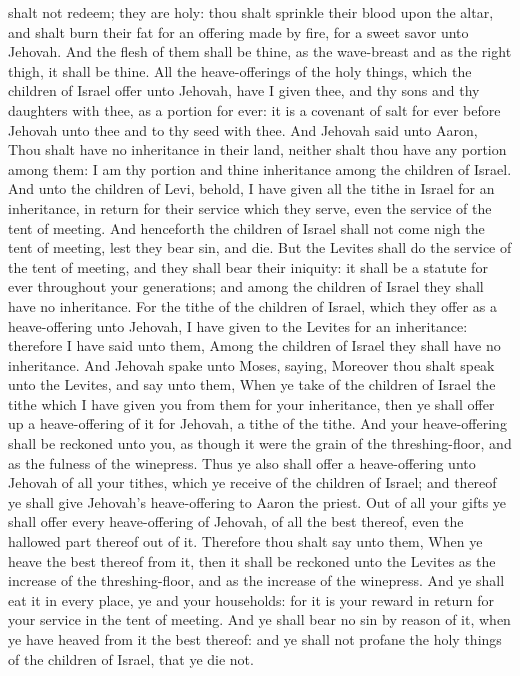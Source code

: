 shalt not redeem; they are holy: thou shalt sprinkle their blood upon the altar, and shalt burn their fat for an offering made by fire, for a sweet savor unto Jehovah. And the flesh of them shall be thine, as the wave-breast and as the right thigh, it shall be thine. All the heave-offerings of the holy things, which the children of Israel offer unto Jehovah, have I given thee, and thy sons and thy daughters with thee, as a portion for ever: it is a covenant of salt for ever before Jehovah unto thee and to thy seed with thee. And Jehovah said unto Aaron, Thou shalt have no inheritance in their land, neither shalt thou have any portion among them: I am thy portion and thine inheritance among the children of Israel.  And unto the children of Levi, behold, I have given all the tithe in Israel for an inheritance, in return for their service which they serve, even the service of the tent of meeting. And henceforth the children of Israel shall not come nigh the tent of meeting, lest they bear sin, and die. But the Levites shall do the service of the tent of meeting, and they shall bear their iniquity: it shall be a statute for ever throughout your generations; and among the children of Israel they shall have no inheritance. For the tithe of the children of Israel, which they offer as a heave-offering unto Jehovah, I have given to the Levites for an inheritance: therefore I have said unto them, Among the children of Israel they shall have no inheritance.  And Jehovah spake unto Moses, saying, Moreover thou shalt speak unto the Levites, and say unto them, When ye take of the children of Israel the tithe which I have given you from them for your inheritance, then ye shall offer up a heave-offering of it for Jehovah, a tithe of the tithe. And your heave-offering shall be reckoned unto you, as though it were the grain of the threshing-floor, and as the fulness of the winepress. Thus ye also shall offer a heave-offering unto Jehovah of all your tithes, which ye receive of the children of Israel; and thereof ye shall give Jehovah’s heave-offering to Aaron the priest. Out of all your gifts ye shall offer every heave-offering of Jehovah, of all the best thereof, even the hallowed part thereof out of it. Therefore thou shalt say unto them, When ye heave the best thereof from it, then it shall be reckoned unto the Levites as the increase of the threshing-floor, and as the increase of the winepress. And ye shall eat it in every place, ye and your households: for it is your reward in return for your service in the tent of meeting. And ye shall bear no sin by reason of it, when ye have heaved from it the best thereof: and ye shall not profane the holy things of the children of Israel, that ye die not. 

